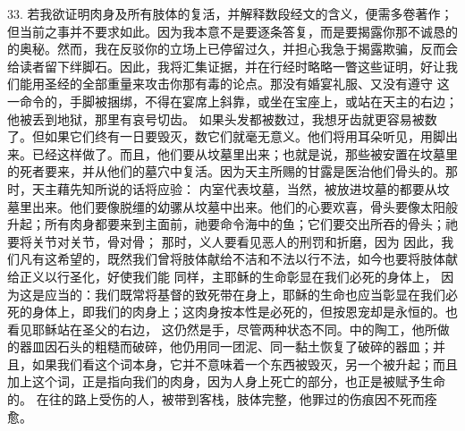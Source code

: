33. 若我欲证明肉身及所有肢体的复活，并解释数段经文的含义，便需多卷著作；但当前之事并不要求如此。因为我本意不是要逐条答复，而是要揭露你那不诚恳的的奥秘。然而，我在反驳你的立场上已停留过久，并担心我急于揭露欺骗，反而会给读者留下绊脚石。因此，我将汇集证据，并在行经时略略一瞥这些证明，好让我们能用圣经的全部重量来攻击你那有毒的论点。那没有婚宴礼服、又没有遵守 这一命令的，手脚被捆绑，不得在宴席上斜靠，或坐在宝座上，或站在天主的右边； 他被丢到地狱，那里有哀号切齿。 如果头发都被数过，我想牙齿就更容易被数了。但如果它们终有一日要毁灭，数它们就毫无意义。他们将用耳朵听见，用脚出来。已经这样做了。而且，他们要从坟墓里出来；也就是说，那些被安置在坟墓里的死者要来，并从他们的墓穴中复活。因为天主所赐的甘露是医治他们骨头的。那时，天主藉先知所说的话将应验： 内室代表坟墓，当然，被放进坟墓的都要从坟墓里出来。他们要像脱缰的幼骡从坟墓中出来。他们的心要欢喜，骨头要像太阳般升起；所有肉身都要来到主面前，祂要命令海中的鱼；它们要交出所吞的骨头；祂要将关节对关节，骨对骨； 那时，义人要看见恶人的刑罚和折磨，因为 因此，我们凡有这希望的，既然我们曾将肢体献给不洁和不法以行不法，如今也要将肢体献给正义以行圣化，好使我们能 同样，主耶稣的生命彰显在我们必死的身体上， 因为这是应当的：我们既常将基督的致死带在身上，耶稣的生命也应当彰显在我们必死的身体上，即我们的肉身上；这肉身按本性是必死的，但按恩宠却是永恒的。也看见耶稣站在圣父的右边， 这仍然是手，尽管两种状态不同。中的陶工，他所做的器皿因石头的粗糙而破碎，他仍用同一团泥、同一黏土恢复了破碎的器皿；并且，如果我们看这个词本身，它并不意味着一个东西被毁灭，另一个被升起；而且加上这个词，正是指向我们的肉身，因为人身上死亡的部分，也正是被赋予生命的。 在往的路上受伤的人，被带到客栈，肢体完整，他罪过的伤痕因不死而痊愈。\par

